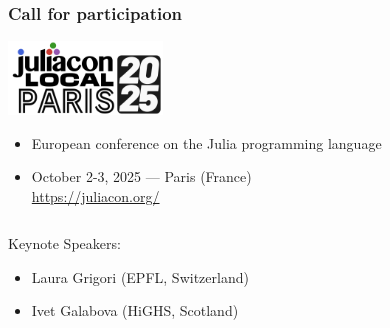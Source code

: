 \documentclass[]{beamer}
\begin{document}
% 
%

\begin{frame}
  \frametitle{Call for participation}
\vspace{3mm}



\hspace{-3mm}\includegraphics[height=1.95cm]{logoparis.png}     \vspace{2mm}\\
\begin{itemize}
\item[] \small{European conference on the Julia programming language}\vspace{-1mm}
\item[] October 2-3, 2025 --- Paris (France)\vspace{-1mm}\\
\smallskip
\url{https://juliacon.org/}
\end{itemize}    
          

\vspace{6mm}

    \begin{columns}
      \begin{column}{0.575\textwidth}
Keynote Speakers: \vspace{2mm}\\

\begin{itemize}
\item[] Laura Grigori (EPFL, Switzerland)\vspace{-1mm}

\item[] Ivet Galabova (HiGHS, Scotland)\vspace{-1mm}


\end{itemize}
\end{column}
\end{columns}
\end{frame}
\end{document}
